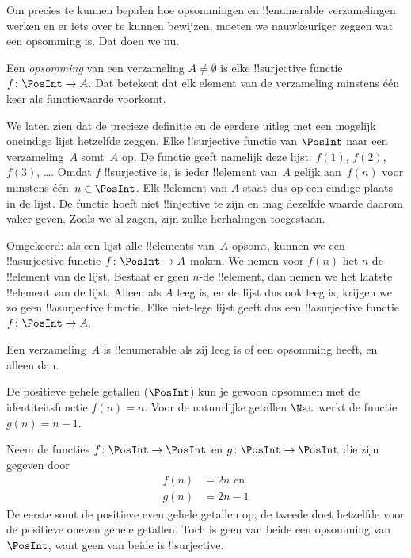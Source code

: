 \documentclass[openany]{memoir}
\begin{document}
Om precies te kunnen bepalen hoe opsommingen en !!{enumerable}
verzamelingen werken en er iets over te kunnen bewijzen, moeten we
nauwkeuriger zeggen wat een opsomming is. Dat doen we nu.

\begin{defn} 
Een \emph{opsomming} van een verzameling $A \neq \emptyset$ is elke
!!{surjective} functie $f \colon \PosInt \to A$. Dat betekent dat elk
element van de verzameling minstens één keer als functiewaarde voorkomt.
\end{defn}

\begin{explain}
We laten zien dat de precieze definitie en de eerdere uitleg met een
mogelijk oneindige lijst hetzelfde zeggen. Elke !!{surjective} functie
van $\PosInt$ naar een verzameling~$A$ somt~$A$ op. De functie geeft
namelijk deze lijst: $f(1)$, $f(2)$, $f(3)$, \dots. Omdat $f$
!!{surjective} is, is ieder !!{element} van~$A$ gelijk aan~$f(n)$ voor
minstens één~$n \in \PosInt$. Elk !!{element} van $A$ staat dus op een
eindige plaats in de lijst. De functie hoeft niet !!{injective} te
zijn en mag dezelfde waarde daarom vaker geven. Zoals we al zagen, zijn
zulke herhalingen toegestaan.

Omgekeerd: als een lijst alle !!{element}s van~$A$ opsomt, kunnen we een
!!a{surjective} functie $f\colon \PosInt \to A$ maken. We nemen voor
$f(n)$ het $n$-de !!{element} van de lijst. Bestaat er geen $n$-de
!!{element}, dan nemen we het laatste !!{element} van de lijst. Alleen
als $A$ leeg is, en de lijst dus ook leeg is, krijgen we zo geen
!!a{surjective} functie. Elke niet-lege lijst geeft dus een
!!a{surjective} functie $f\colon \PosInt \to A$.
\end{explain}

\begin{defn}
  Een verzameling~$A$ is !!{enumerable} als zij leeg is of een opsomming
  heeft, en alleen dan.
\end{defn}

\begin{ex}
De positieve gehele getallen ($\PosInt$) kun je gewoon opsommen met de
identiteitsfunctie $f(n) = n$. Voor de natuurlijke getallen $\Nat$
werkt de functie $g(n) = n - 1$.
\end{ex}

\begin{ex}
Neem de functies $f\colon \PosInt \to \PosInt$ en $g \colon \PosInt \to
\PosInt$ die zijn gegeven door
\begin{align*}
f(n) & = 2n \text{ en}\\
g(n) & = 2n - 1
\end{align*}
De eerste somt de positieve even gehele getallen op; de tweede doet
hetzelfde voor de positieve oneven gehele getallen. Toch is geen van
beide een opsomming van $\PosInt$, want geen van beide is
!!{surjective}.
\end{ex}
\end{document}

